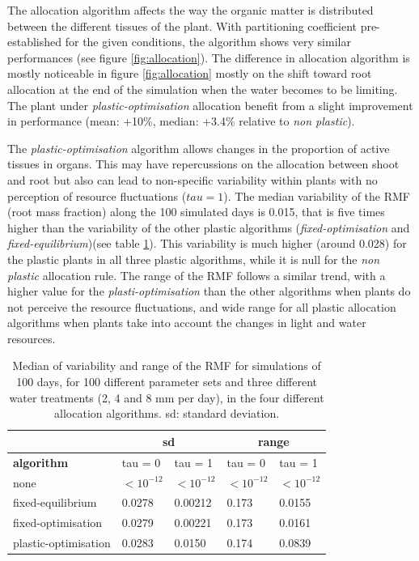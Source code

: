 The allocation algorithm affects the way the organic matter is distributed between the different tissues of the plant. With partitioning coefficient pre-established for the given conditions, the algorithm shows very similar performances (see figure \ref{fig:allocation}). The difference in allocation algorithm is mostly noticeable in figure \ref{fig:allocation} mostly on the shift toward root allocation at the end of the simulation when the water becomes to be limiting. The plant under \textit{plastic-optimisation} allocation benefit from a slight improvement in performance (mean: +10\%, median: +3.4\% relative to \textit{non plastic}).

The \textit{plastic-optimisation} algorithm allows changes in the proportion of active tissues in organs. This may have repercussions on the allocation between shoot and root but also can lead to non-specific variability within plants with no perception of resource fluctuations ($tau = 1$). The median variability of the RMF (root mass fraction) along the 100 simulated days is 0.015, that is five times higher than the variability of the other plastic algorithms (\textit{fixed-optimisation} and \textit{fixed-equilibrium})(see table \ref{table:variability-rmf}). This variability is much higher (around 0.028) for the plastic plants in all three plastic algorithms, while it is null for the \textit{non plastic} allocation rule. The range of the RMF follows a similar trend, with a higher value for the \textit{plasti-optimisation} than the other algorithms when plants do not perceive the resource fluctuations, and wide range for all plastic allocation algorithms when plants take into account the changes in light and water resources.

\begin{table}[h]
\centering
\caption{Median of variability and range of the RMF for simulations of 100 days, for 100 different parameter sets and three different water treatments (2, 4 and 8 mm per day), in the four different allocation algorithms. sd: standard deviation.}
\label{table:variability-rmf}
\begin{tabular}{l|ll|ll}
            & \multicolumn{2}{c}{\textbf{sd}}              & \multicolumn{2}{c}{\textbf{range}}           \\
\hline
\textbf{algorithm}                     & tau = 0          & tau = 1          & tau = 0          & tau = 1          \\
\hline
none                 & $<10^{-12}$ & $<10^{-12}$ & $<10^{-12}$ & $<10^{-12}$ \\
fixed-equilibrium    & 0.0278           & 0.00212          & 0.173            & 0.0155           \\
fixed-optimisation   & 0.0279           & 0.00221          & 0.173            & 0.0161           \\
plastic-optimisation & 0.0283           & 0.0150           & 0.174            & 0.0839          
\end{tabular}
\end{table}


